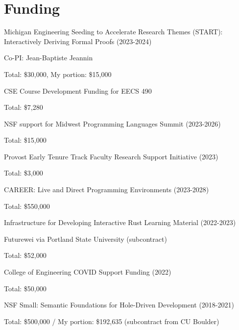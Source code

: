\documentclass[10pt,letterpaper]{article}
\renewenvironment{itemize}{
  \begin{list}{}{
    \setlength{\leftmargin}{1.25em}
    \setlength{\itemsep}{0.25em}
    \setlength{\parskip}{0pt}
    \setlength{\parsep}{0.2em}
  }
}{
  \end{list}
}
\begin{document}
\section*{Funding}

\begin{itemize}
  \item Michigan Engineering Seeding to Accelerate Research Themes (START):\\
        Interactively Deriving Formal Proofs (2023-2024)
        \begin{itemize}
          \item Co-PI: Jean-Baptiste Jeannin
          \item Total: \$30,000, My portion: \$15,000
        \end{itemize}
  \item CSE Course Development Funding for EECS 490
        \begin{itemize}
          \item Total: \$7,280
        \end{itemize}
  \item NSF support for Midwest Programming Languages Summit (2023-2026)
        \begin{itemize}
          \item Total: \$15,000
        \end{itemize}
  \item Provost Early Tenure Track Faculty Research Support Initiative (2023)
        \begin{itemize}
          \item Total: \$3,000
        \end{itemize}
  \item CAREER: Live and Direct Programming Environments (2023-2028)
        \begin{itemize}
          \item Total: \$550,000
        \end{itemize}
  \item Infrastructure for Developing Interactive Rust Learning Material (2022-2023)
        \begin{itemize}
          \item Futurewei via Portland State University (subcontract)
          \item Total: \$52,000
        \end{itemize}
  \item College of Engineering COVID Support Funding (2022)
        \begin{itemize}
          \item Total: \$50,000
        \end{itemize}
  \item NSF Small: Semantic Foundations for Hole-Driven Development (2018-2021)
        \begin{itemize}
          \item Total: \$500,000 / My portion: \$192,635 (subcontract from CU Boulder)
        \end{itemize}
\end{itemize}
\end{document}
